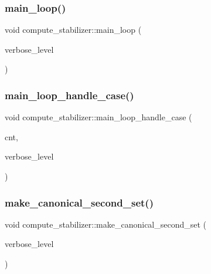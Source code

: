 \mbox{\label{classcompute__stabilizer_ae8615a28e0494704450689b6ea0b7ca2}} 
\subsubsection{\texorpdfstring{main\+\_\+loop()}{main\_loop()}}
{\footnotesize\ttfamily void compute\+\_\+stabilizer\+::main\+\_\+loop (\begin{DoxyParamCaption}\item[{\mbox{\hyperlink{galois_8h_a09fddde158a3a20bd2dcadb609de11dc}{I\+NT}}}]{verbose\+\_\+level }\end{DoxyParamCaption})}

\mbox{\label{classcompute__stabilizer_a040fb5c6ad50133c5a16a35ed5b2ecc4}} 
\subsubsection{\texorpdfstring{main\+\_\+loop\+\_\+handle\+\_\+case()}{main\_loop\_handle\_case()}}
{\footnotesize\ttfamily void compute\+\_\+stabilizer\+::main\+\_\+loop\+\_\+handle\+\_\+case (\begin{DoxyParamCaption}\item[{\mbox{\hyperlink{galois_8h_a09fddde158a3a20bd2dcadb609de11dc}{I\+NT}}}]{cnt,  }\item[{\mbox{\hyperlink{galois_8h_a09fddde158a3a20bd2dcadb609de11dc}{I\+NT}}}]{verbose\+\_\+level }\end{DoxyParamCaption})}

\mbox{\label{classcompute__stabilizer_aa33f9b1e4823afd5196eec36d3082084}} 
\subsubsection{\texorpdfstring{make\+\_\+canonical\+\_\+second\+\_\+set()}{make\_canonical\_second\_set()}}
{\footnotesize\ttfamily void compute\+\_\+stabilizer\+::make\+\_\+canonical\+\_\+second\+\_\+set (\begin{DoxyParamCaption}\item[{\mbox{\hyperlink{galois_8h_a09fddde158a3a20bd2dcadb609de11dc}{I\+NT}}}]{verbose\+\_\+level }\end{DoxyParamCaption})}

